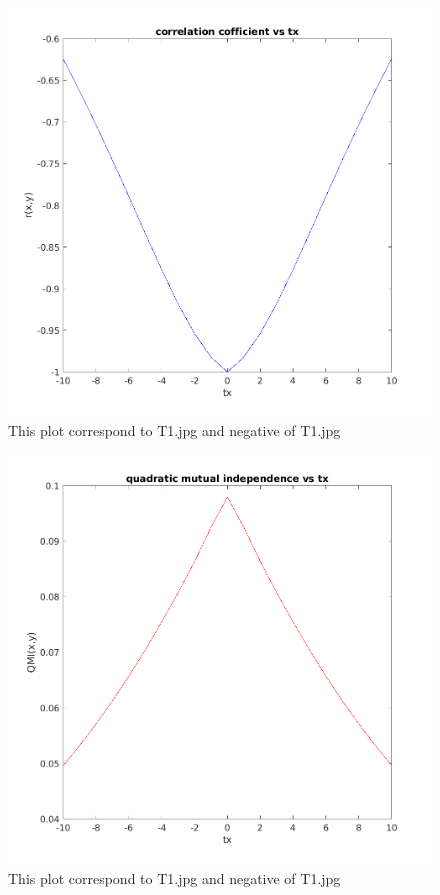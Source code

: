 \documentclass{article}
\theoremstyle{remark}
\begin{document}
\begin{figure}[h!]
    \includegraphics[width=\textwidth, height=\textheight, keepaspectratio]{cor_cof2.png}
    \caption{This plot correspond to T1.jpg and negative of T1.jpg}
\end{figure}

\begin{figure}[h!]
    \includegraphics[width=\textwidth, height=\textheight, keepaspectratio]{quadMutInf2.png}
    \caption{This plot correspond to T1.jpg and negative of T1.jpg}
\end{figure}
\end{document}
